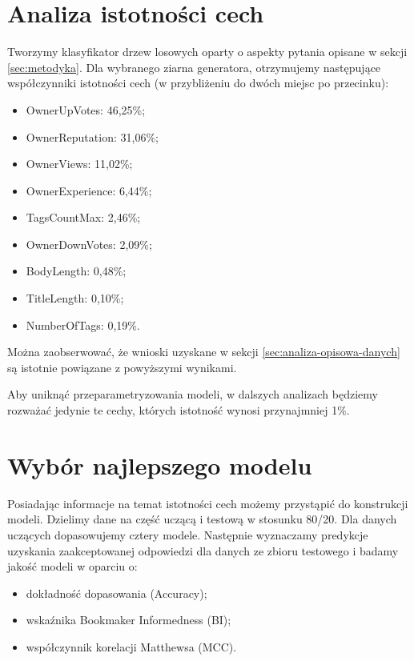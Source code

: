 \documentclass[12pt]{article}
\begin{document}
	\section{Analiza istotności cech}\label{sec:analiza-istotnosci-cech}
	Tworzymy klasyfikator drzew losowych oparty o aspekty pytania opisane w sekcji \ref{sec:metodyka}. Dla wybranego ziarna generatora, otrzymujemy następujące współczynniki istotności cech (w przybliżeniu do dwóch miejsc po przecinku):
	\begin{itemize}
		\item OwnerUpVotes: 46,25\%;
		\item OwnerReputation: 31,06\%;
		\item OwnerViews: 11,02\%;
		\item OwnerExperience: 6,44\%;
		\item TagsCountMax: 2,46\%;
		\item OwnerDownVotes: 2,09\%;
		\item BodyLength: 0,48\%;
		\item TitleLength: 0,10\%;
		\item NumberOfTags: 0,19\%.
	\end{itemize}
	Można zaobserwować, że wnioski uzyskane w sekcji \ref{sec:analiza-opisowa-danych} są istotnie powiązane z powyższymi wynikami.
	
	\vspace{0.25cm}
	
	Aby uniknąć przeparametryzowania modeli, w dalszych analizach będziemy rozważać jedynie te cechy, których istotność wynosi przynajmniej 1\%.
	
	\section{Wybór najlepszego modelu}\label{sec:wybor-najlepszego-modelu}
	Posiadając informacje na temat istotności cech możemy przystąpić do konstrukcji modeli. Dzielimy dane na część uczącą i testową w stosunku 80/20. Dla danych uczących dopasowujemy cztery modele. Następnie wyznaczamy predykcje uzyskania zaakceptowanej odpowiedzi dla danych ze zbioru testowego i badamy jakość modeli w oparciu o: 
	\begin{itemize}
		\item dokładność dopasowania (Accuracy); 
		\item wskaźnika Bookmaker Informedness (BI);
		\item współczynnik korelacji Matthewsa (MCC). 
	\end{itemize}
\end{document}
